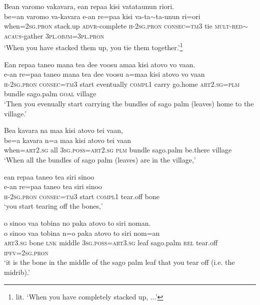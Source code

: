 \ea\label{ex:text2-11}
Bean varomo vakavara, ean repaa kisi vatataunun riori.\\
\gll be=an	varomo	va-kavara	e-an	re=paa	kisi	va-ta{$\sim$}ta-unun	ri=ori\\
     when=2\textsc{sg}.\textsc{pron}	stack.up	\textsc{advr}-complete	\textsc{h}-2\textsc{sg}.\textsc{pron}	\textsc{consec}=\textsc{tm}3	tie	\textsc{mult}-\textsc{red}{$\sim$}\textsc{acaus}-gather	3\textsc{pl}.\textsc{objm}=3\textsc{pl}.\textsc{pron}\\
\glt `When you have stacked them up, you tie them together.'\footnote{lit. `When you have completely stacked up, ...'}
\z

\ea\label{ex:text2-12}
Ean repaa taneo mana tea dee voosu amaa kisi atovo vo vaan.\\
\gll e-an	re=paa	taneo	mana	tea	dee	voosu	a=maa	kisi	atovo	vo	vaan\\
     \textsc{h}-2\textsc{sg}.\textsc{pron}	\textsc{consec}=\textsc{tm}3	start	eventually	\textsc{compl}1	carry	go.home	\textsc{art}2.\textsc{sg}=\textsc{plm}	bundle	sago.palm	\textsc{goal}	village\\
\glt `Then you evenually start carrying the bundles of sago palm (leaves) home to the village.'
\z

\ea\label{ex:text2-13}
Bea kavara na maa kisi atovo tei vaan,\\
\gll be=a	kavara	n=a	maa	kisi	atovo	tei	vaan\\
     when=\textsc{art}2.\textsc{sg}	all	3\textsc{sg}.\textsc{poss}=\textsc{art}2.\textsc{sg}	\textsc{plm}	bundle	sago.palm	be.there	village\\
\glt `When all the bundles of sago palm (leaves) are in the village,'
\z

\ea\label{ex:text2-14}
ean repaa taneo tea siri sinoo\\
\gll e-an	re=paa	taneo	tea	siri	sinoo\\
     \textsc{h}-2\textsc{sg}.\textsc{pron}	\textsc{consec}=\textsc{tm}3	start	\textsc{compl}1	tear.off	bone\\
\glt `you start tearing off the bones,'
\z

\ea\label{ex:text2-15}
o sinoo vaa tobina no paka atovo to siri noman.\\
\gll o	sinoo	vaa	tobina	n=o	paka	atovo	to	siri	nom=an\\
     \textsc{art}3.\textsc{sg}	bone	\textsc{lnk}	middle	3\textsc{sg}.\textsc{poss}=\textsc{art}3.\textsc{sg}	leaf	sago.palm	\textsc{rel}	tear.off	\textsc{ipfv}=2\textsc{sg}.\textsc{pron}\\
\glt `it is the bone in the middle of the sago palm leaf that you tear off (i.e. the midrib).'
\z

